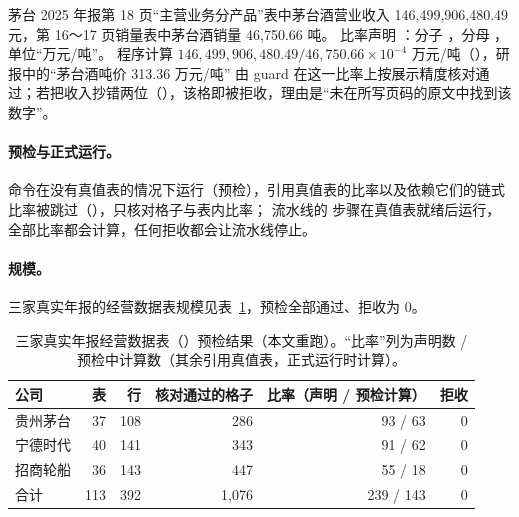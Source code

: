 \begin{example}[茅台酒吨价]
茅台 2025 年报第 18 页“主营业务分产品”表中茅台酒营业收入 146,499,906,480.49 元，第 16～17 页销量表中茅台酒销量 46,750.66 吨。
比率声明 ：分子 \code{["product",} \code{"茅台酒","营业收入"]}，分母 ，单位“万元/吨”。
程序计算 $146{,}499{,}906{,}480.49 / 46{,}750.66 \times 10^{-4}$ 万元/吨（），研报中的“茅台酒吨价 313.36 万元/吨”
由 guard 在这一比率上按展示精度核对通过；若把收入抄错两位（），该格即被拒收，理由是“未在所写页码的原文中找到该数字”。
\end{example}

\paragraph{预检与正式运行。}
 命令在没有真值表的情况下运行（预检），引用真值表的比率以及依赖它们的链式比率被跳过（），只核对格子与表内比率；
流水线的  步骤在真值表就绪后运行，全部比率都会计算，任何拒收都会让流水线停止。

\paragraph{规模。}
三家真实年报的经营数据表规模见表~\ref{tab:ext-extras}，预检全部通过、拒收为 0。

\begin{table}[t]
\centering
\caption{三家真实年报经营数据表（）预检结果（本文重跑）。“比率”列为声明数 / 预检中计算数（其余引用真值表，正式运行时计算）。}
\label{tab:ext-extras}
\small
\begin{tabular}{lrrrrr}
\toprule
公司 & 表 & 行 & 核对通过的格子 & 比率（声明 / 预检计算） & 拒收 \\
\midrule
贵州茅台 & 37 & 108 & 286 & 93 / 63 & 0 \\
宁德时代 & 40 & 141 & 343 & 91 / 62 & 0 \\
招商轮船 & 36 & 143 & 447 & 55 / 18 & 0 \\
\midrule
合计 & 113 & 392 & 1{,}076 & 239 / 143 & 0 \\
\bottomrule
\end{tabular}
\end{table}

